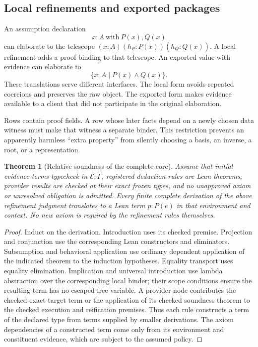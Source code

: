 \documentclass[11pt,a4paper]{article}
\newtheorem{theorem}{Theorem}[section]
\theoremstyle{definition}
\theoremstyle{remark}
\begin{document}
\subsection{Local refinements and exported packages}
An assumption declaration
\[
 x:A\ \text{with}\ P(x),Q(x)
\]
can elaborate to the telescope $(x:A)(h_P:P(x))(h_Q:Q(x))$. A local refinement adds a proof binding to that telescope. An exported value-with-evidence can elaborate to
\[
 \{x:A\mid P(x)\wedge Q(x)\}.
\]
These translations serve different interfaces. The local form avoids repeated coercions and preserves the raw object. The exported form makes evidence available to a client that did not participate in the original elaboration.

Rows contain proof fields. A row whose later facts depend on a newly chosen data witness must make that witness a separate binder. This restriction prevents an apparently harmless ``extra property'' from silently choosing a basis, an inverse, a root, or a representation.

\begin{theorem}[Relative soundness of the complete core]
\label{thm:translation}
Assume that initial evidence terms typecheck in $\mathcal E;\Gamma$, registered deduction rules are Lean theorems, provider results are checked at their exact frozen types, and no unapproved axiom or unresolved obligation is admitted. Every finite complete derivation of the above refinement judgment translates to a Lean term $p:P(e)$ in that environment and context. No new axiom is required by the refinement rules themselves.
\end{theorem}
\begin{proof}
Induct on the derivation. Introduction uses its checked premise. Projection and conjunction use the corresponding Lean constructors and eliminators. Subsumption and behavioral application use ordinary dependent application of the indicated theorem to the induction hypotheses. Equality transport uses equality elimination. Implication and universal introduction use lambda abstraction over the corresponding local binder; their scope conditions ensure the resulting term has no escaped free variable. A provider node contributes the checked exact-target term or the application of its checked soundness theorem to the checked execution and reification premises. Thus each rule constructs a term of the declared type from terms supplied by smaller derivations. The axiom dependencies of a constructed term come only from its environment and constituent evidence, which are subject to the assumed policy.
\end{proof}
\end{document}
